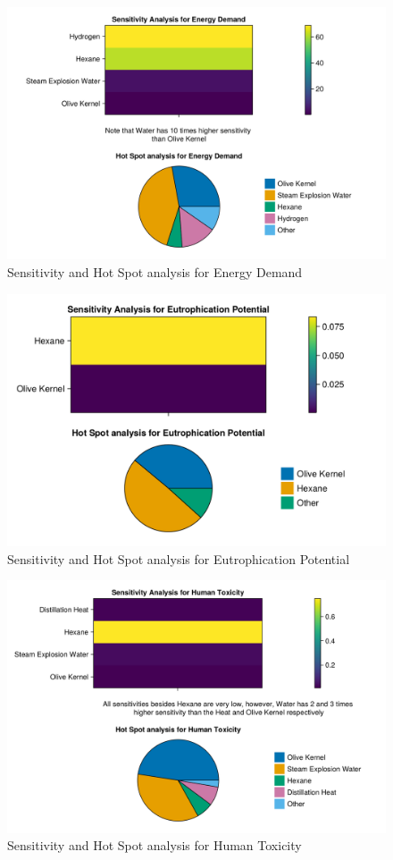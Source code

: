 \documentclass[11pt]{article}
\begin{document}
\begin{figure}[htbp]
\centering
\includegraphics[width=.9\linewidth]{./plots/ed_plots.png}
\caption{Sensitivity and Hot Spot analysis for Energy Demand}
\end{figure}

\begin{figure}[htbp]
\centering
\includegraphics[width=.9\linewidth]{./plots/ep_plots.png}
\caption{Sensitivity and Hot Spot analysis for Eutrophication Potential}
\end{figure}

\begin{figure}[htbp]
\centering
\includegraphics[width=.9\linewidth]{./plots/ht_plots.png}
\caption{Sensitivity and Hot Spot analysis for Human Toxicity}
\end{figure}
\end{document}
